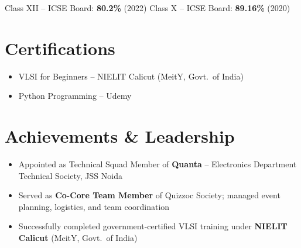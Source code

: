 \documentclass[a4paper,10pt]{article}
\begin{document}
Class XII -- ICSE Board: \textbf{80.2\%} (2022) \hfill Class X -- ICSE Board: \textbf{89.16\%} (2020)

\section{Certifications}

\begin{itemize}
    \item VLSI for Beginners -- NIELIT Calicut (MeitY, Govt.\ of India)
    \item Python Programming -- Udemy
\end{itemize}

\section{Achievements \& Leadership}

\begin{itemize}
    \item Appointed as Technical Squad Member of \textbf{Quanta} -- Electronics Department Technical Society, JSS Noida
    \item Served as \textbf{Co-Core Team Member} of Quizzoc Society; managed event planning, logistics, and team coordination
    \item Successfully completed government-certified VLSI training under \textbf{NIELIT Calicut} (MeitY, Govt.\ of India)
\end{itemize}
\end{document}
